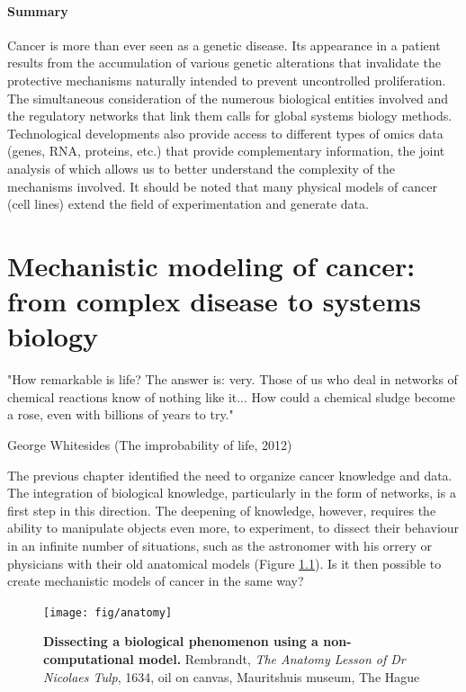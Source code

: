 \documentclass[a4paper,12pt,twoside,onecolumn,openright,final,oldfontcommands]{memoir}
\newcommand{\initial}[1]{
	\lettrine[lines=3,lhang=0.33,nindent=0em]{
		\color{gray}
     		{\textsc{#1}}}{}}
\let\BeginKnitrBlock\begin \let\EndKnitrBlock\end
\begin{document}
\BeginKnitrBlock{conclubox}
\subsubsection*{Summary}\label{summary-1}

Cancer is more than ever seen as a genetic disease. Its appearance in a
patient results from the accumulation of various genetic alterations
that invalidate the protective mechanisms naturally intended to prevent
uncontrolled proliferation. The simultaneous consideration of the
numerous biological entities involved and the regulatory networks that
link them calls for global systems biology methods. Technological
developments also provide access to different types of omics data
(genes, RNA, proteins, etc.) that provide complementary information, the
joint analysis of which allows us to better understand the complexity of
the mechanisms involved. It should be noted that many physical models of
cancer (cell lines) extend the field of experimentation and generate
data.
\EndKnitrBlock{conclubox}

\chapter{Mechanistic modeling of cancer: from complex disease to systems
biology}\label{mechanistic-cancer}

\epigraph{"How remarkable is life? The answer is: very. Those of us who deal in networks of chemical reactions know of nothing like it... How could a chemical sludge become a rose, even with billions of years to try."}{George Whitesides (The improbability of life, 2012)}

\initial{T}he previous chapter identified the need to organize cancer
knowledge and data. The integration of biological knowledge,
particularly in the form of networks, is a first step in this direction.
The deepening of knowledge, however, requires the ability to manipulate
objects even more, to experiment, to dissect their behaviour in an
infinite number of situations, such as the astronomer with his orrery or
physicians with their old anatomical models (Figure \ref{fig:anatomy}).
Is it then possible to create mechanistic models of cancer in the same
way?

\begin{figure}

{\centering \texttt{[image: fig/anatomy]} 

}

\caption[Dissecting a biological phenomenon using a non-computational model]{\textbf{Dissecting a biological phenomenon using a
non-computational model.} Rembrandt, \emph{The Anatomy Lesson of Dr
Nicolaes Tulp}, 1634, oil on canvas, Mauritshuis museum, The Hague}\label{fig:anatomy}
\end{figure}
\end{document}
